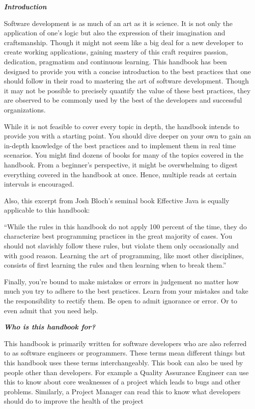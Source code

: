 \textbf{\emph{Introduction}}



Software development is as much of an art as it is science. It is not only the application of one's logic but also the expression of their imagination and craftsmanship. Though it might not seem like a big deal for a new developer to create working applications, gaining mastery of this craft requires passion, dedication, pragmatism and continuous learning. This handbook has been designed to provide you with a concise introduction to the best practices that one should follow in their road to mastering the art of software development. Though it may not be possible to precisely quantify the value of these best practices, they are observed to be commonly used by the best of the developers and successful organizations. 

While it is not feasible to cover every topic in depth, the handbook intends to provide you with a starting point. You should dive deeper on your own to gain an in-depth knowledge of the best practices and to implement them in real time scenarios. You might find dozens of books for many of the topics covered in the handbook. From a beginner's perspective, it might be overwhelming to digest everything covered in the handbook at once. Hence, multiple reads at certain intervals is encouraged.  

Also, this excerpt from Josh Bloch’s seminal book Effective Java is equally applicable to this handbook: 

“While the rules in this handbook do not apply 100 percent of the time, they do characterize best programming practices in the great majority of cases. You should not slavishly follow these rules, but violate them only occasionally and with good reason. Learning the art of programming, like most other disciplines, consists of first learning the rules and then learning when to break them.”

Finally, you're bound to make mistakes or errors in judgement no matter how much you try to adhere to the best practices. Learn from your mistakes and take the responsibility to rectify them. Be open to admit ignorance or error. Or to even admit that you need help. 

\textbf{\emph{Who is this handbook for?}}

This handbook is primarily written for software developers who are also referred to as software engineers or programmers. These terms mean different things but this handbook uses these terms interchangeably.  This book can also be used by people other than developers. For example a Quality Assurance Engineer can use this to know about core weaknesses of a project which leads to bugs and other problems. Similarly, a Project Manager can read this to know what developers should do to improve the health of the project  



